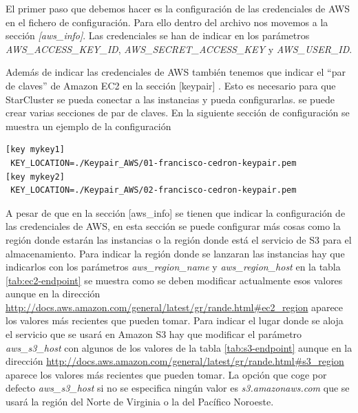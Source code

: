 \documentclass{article}
\begin{document}
	El primer paso que debemos hacer es la configuración de las credenciales de AWS en el fichero de configuración. Para ello dentro del archivo nos movemos a la sección \emph{[aws\_info]}. Las credenciales se han de indicar en los parámetros \emph{AWS\_ACCESS\_KEY\_ID}, \emph{AWS\_SECRET\_ACCESS\_KEY} y \emph{AWS\_USER\_ID}.
	
	Además de indicar las credenciales de AWS también tenemos que indicar el ``par de claves'' de Amazon EC2 en la sección [keypair] . Esto es necesario para que StarCluster se pueda conectar a las instancias y pueda configurarlas. se puede crear varias secciones de par de claves. En la siguiente sección de configuración se muestra un ejemplo de la configuración
\begin{lstlisting}
[key mykey1]
 KEY_LOCATION=./Keypair_AWS/01-francisco-cedron-keypair.pem
[key mykey2]
 KEY_LOCATION=./Keypair_AWS/02-francisco-cedron-keypair.pem
\end{lstlisting}

	A pesar de que en la sección [aws\_info] se tienen que indicar la configuración de las credenciales de AWS, en esta sección se puede configurar más cosas como la región donde estarán las instancias o la región donde está el servicio de S3 para el almacenamiento. Para indicar la región donde se lanzaran las instancias hay que indicarlos con los parámetros \emph{aws\_region\_name} y \emph{aws\_region\_host} en la tabla \ref{tab:ec2-endpoint} se muestra como se deben modificar actualmente esos valores aunque en la dirección \url{http://docs.aws.amazon.com/general/latest/gr/rande.html#ec2_region} aparece los valores más recientes que pueden tomar. Para indicar el lugar donde se aloja el servicio que se usará en Amazon S3 hay que modificar el parámetro \emph{aws\_s3\_host} con algunos de los valores de la tabla \ref{tab:s3-endpoint} aunque en la dirección \url{http://docs.aws.amazon.com/general/latest/gr/rande.html#s3_region} aparece los valores más recientes que pueden tomar. La opción que coge por defecto \emph{aws\_s3\_host} si no se especifica ningún valor es \emph{s3.amazonaws.com} que se usará la región del Norte de Virginia o la del Pacífico Noroeste.
\end{document}
